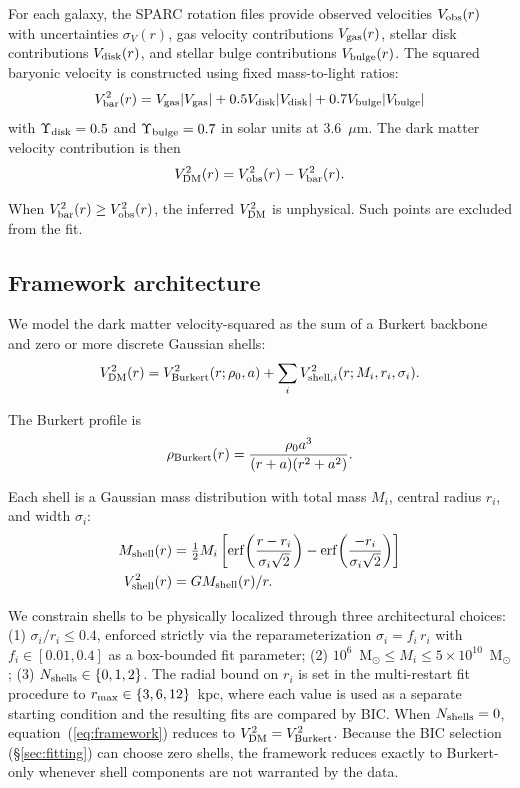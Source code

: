 For each galaxy, the SPARC rotation files provide observed velocities $V_{\rm obs}(r)$ with uncertainties $\sigma_V(r)$, gas velocity contributions $V_{\rm gas}(r)$, stellar disk contributions $V_{\rm disk}(r)$, and stellar bulge contributions $V_{\rm bulge}(r)$. The squared baryonic velocity is constructed using fixed mass-to-light ratios:
\begin{equation}
V^2_{\rm bar}(r) = V_{\rm gas}|V_{\rm gas}| + 0.5 V_{\rm disk}|V_{\rm disk}| + 0.7 V_{\rm bulge}|V_{\rm bulge}|
\label{eq:vbar}
\end{equation}
with $\Upsilon_{\rm disk} = 0.5$ and $\Upsilon_{\rm bulge} = 0.7$ in solar units at 3.6~$\mu$m. The dark matter velocity contribution is then
\begin{equation}
V^2_{\rm DM}(r) = V^2_{\rm obs}(r) - V^2_{\rm bar}(r).
\label{eq:vdm}
\end{equation}

When $V^2_{\rm bar}(r) \geq V^2_{\rm obs}(r)$, the inferred $V^2_{\rm DM}$ is unphysical. Such points are excluded from the fit.

\subsection{Framework architecture}
\label{sec:arch}

We model the dark matter velocity-squared as the sum of a Burkert backbone and zero or more discrete Gaussian shells:
\begin{equation}
V^2_{\rm DM}(r) = V^2_{\rm Burkert}(r; \rho_0, a) + \sum_i V^2_{{\rm shell},i}(r; M_i, r_i, \sigma_i).
\label{eq:framework}
\end{equation}

The Burkert profile is
\begin{equation}
\rho_{\rm Burkert}(r) = \frac{\rho_0 a^3}{(r + a)(r^2 + a^2)}.
\end{equation}

Each shell is a Gaussian mass distribution with total mass $M_i$, central radius $r_i$, and width $\sigma_i$:
\begin{align}
M_{\rm shell}(r) &= \tfrac{1}{2} M_i \left[ \mathrm{erf}\!\left(\frac{r - r_i}{\sigma_i\sqrt{2}}\right) - \mathrm{erf}\!\left(\frac{-r_i}{\sigma_i\sqrt{2}}\right) \right] \\
V^2_{\rm shell}(r) &= G M_{\rm shell}(r) / r.
\end{align}

We constrain shells to be physically localized through three architectural choices: (1) $\sigma_i / r_i \leq 0.4$, enforced strictly via the reparameterization $\sigma_i = f_i \, r_i$ with $f_i \in [0.01, 0.4]$ as a box-bounded fit parameter; (2) $10^6$~M$_\odot \leq M_i \leq 5 \times 10^{10}$~M$_\odot$; (3) $N_{\rm shells} \in \{0, 1, 2\}$. The radial bound on $r_i$ is set in the multi-restart fit procedure to $r_{\rm max} \in \{3, 6, 12\}$~kpc, where each value is used as a separate starting condition and the resulting fits are compared by BIC. When $N_{\rm shells} = 0$, equation~(\ref{eq:framework}) reduces to $V^2_{\rm DM} = V^2_{\rm Burkert}$. Because the BIC selection (\S\ref{sec:fitting}) can choose zero shells, the framework reduces exactly to Burkert-only whenever shell components are not warranted by the data.

